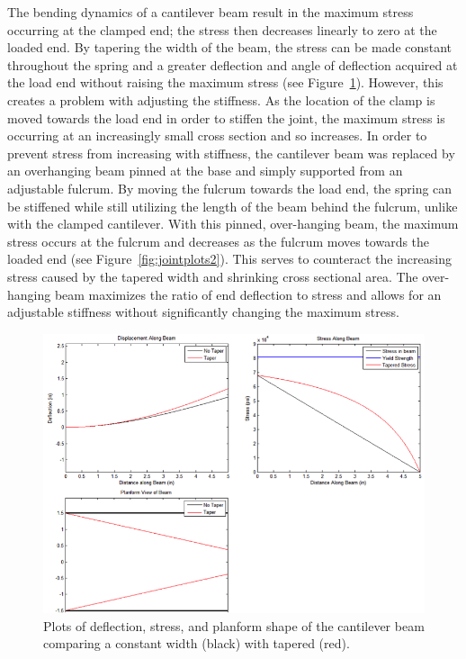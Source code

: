 \documentclass[11pt]{article}
\begin{document}
The bending dynamics of a cantilever beam result in the maximum stress occurring at the clamped end; the stress then decreases linearly to zero at the loaded end. By tapering the width of the beam, the stress can be made constant throughout the spring and a greater deflection and angle of deflection acquired at the load end without raising the maximum stress (see Figure~\ref{fig:jointplots1}). However, this creates a problem with adjusting the stiffness. As the location of the clamp is moved towards the load end in order to stiffen the joint, the maximum stress is occurring at an increasingly small cross section and so increases. In order to prevent stress from increasing with stiffness, the cantilever beam was replaced by an overhanging beam pinned at the base and simply supported from an adjustable fulcrum. By moving the fulcrum towards the load end, the spring can be stiffened while still utilizing the length of the beam behind the fulcrum, unlike with the clamped cantilever. With this pinned, over-hanging beam, the maximum stress occurs at the fulcrum and decreases as the fulcrum moves towards the loaded end (see Figure~\ref{fig:jointplots2}). This serves to counteract the increasing stress caused by the tapered width and shrinking cross sectional area. The over-hanging beam maximizes the ratio of end deflection to stress and allows for an adjustable stiffness without significantly changing the maximum stress.

\begin{figure}[H]
\centering
\includegraphics[]{jointgraphs1.png}
\caption{Plots of deflection, stress, and planform shape of the cantilever beam comparing a constant width (black) with tapered (red).}
\label{fig:jointplots1}
\end{figure}
\end{document}

